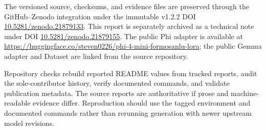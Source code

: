 \documentclass[11pt]{article}
\begin{document}
The versioned source, checksums, and evidence files are preserved through the
GitHub--Zenodo integration under the immutable v1.2.2 DOI
\href{https://doi.org/10.5281/zenodo.21879133}{10.5281/zenodo.21879133}.
This report is separately archived as a technical note under DOI
\href{https://doi.org/10.5281/zenodo.21879155}{10.5281/zenodo.21879155}.
The public Phi adapter is available at
\url{https://huggingface.co/steven0226/phi-4-mini-formosanlu-lora}; the public
Gemma adapter and Dataset are linked from the source repository.

Repository checks rebuild reported README values from tracked reports, audit the
sole-contributor history, verify documented commands, and validate publication
metadata.  The source reports are authoritative if prose and machine-readable
evidence differ.  Reproduction should use the tagged environment and documented
commands rather than rerunning generation with newer upstream model revisions.



\end{document}
